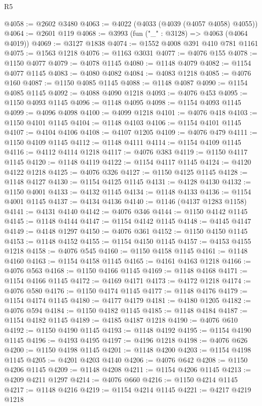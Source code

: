 \begin{lexlean}{R5}
\begin{coremodule}
@4058 := @2602 @3480
@4063 := @4022 (@4033 (@4039 (@4057 @4058) @4055))
@4064 := @2601 @119
@4068 := @3993 (fun ("_" : @3128) => @4063 (@4064 @4019))
@4069 := @3127 @1838
@4074 := @1552 @4008 @391 @410 @781 @1161
@4075 := @1563 @1218
@4076 := @1163 @3031
@4077 := @4076 @155
@4078 := @1150 @4077
@4079 := @4078 @1145
@4080 := @1148 @4079
@4082 := @1154 @4077 @1145
@4083 := @4080 @4082
@4084 := @4083 @1218
@4085 := @4076 @160
@4087 := @1150 @4085 @1145
@4088 := @1148 @4087
@4090 := @1154 @4085 @1145
@4092 := @4088 @4090 @1218
@4093 := @4076 @453
@4095 := @1150 @4093 @1145
@4096 := @1148 @4095
@4098 := @1154 @4093 @1145
@4099 := @4096 @4098
@4100 := @4099 @1218
@4101 := @4076 @418
@4103 := @1150 @4101 @1145
@4104 := @1148 @4103
@4106 := @1154 @4101 @1145
@4107 := @4104 @4106
@4108 := @4107 @1205
@4109 := @4076 @479
@4111 := @1150 @4109 @1145
@4112 := @1148 @4111
@4114 := @1154 @4109 @1145
@4116 := @4112 @4114 @1218
@4117 := @4076 @383
@4119 := @1150 @4117 @1145
@4120 := @1148 @4119
@4122 := @1154 @4117 @1145
@4124 := @4120 @4122 @1218
@4125 := @4076 @326
@4127 := @1150 @4125 @1145
@4128 := @1148 @4127
@4130 := @1154 @4125 @1145
@4131 := @4128 @4130
@4132 := @1150 @4001
@4133 := @4132 @1145
@4134 := @1148 @4133
@4136 := @1154 @4001 @1145
@4137 := @4134 @4136
@4140 := @1146 (@4137 @1283 @1158)
@4141 := @4131 @4140
@4142 := @4076 @346
@4144 := @1150 @4142 @1145
@4145 := @1148 @4144
@4147 := @1154 @4142 @1145
@4148 := @4145 @4147
@4149 := @4148 @1297
@4150 := @4076 @361
@4152 := @1150 @4150 @1145
@4153 := @1148 @4152
@4155 := @1154 @4150 @1145
@4157 := @4153 @4155 @1218
@4158 := @4076 @545
@4160 := @1150 @4158 @1145
@4161 := @1148 @4160
@4163 := @1154 @4158 @1145
@4165 := @4161 @4163 @1218
@4166 := @4076 @563
@4168 := @1150 @4166 @1145
@4169 := @1148 @4168
@4171 := @1154 @4166 @1145
@4172 := @4169 @4171
@4173 := @4172 @1218
@4174 := @4076 @580
@4176 := @1150 @4174 @1145
@4177 := @1148 @4176
@4179 := @1154 @4174 @1145
@4180 := @4177 @4179
@4181 := @4180 @1205
@4182 := @4076 @594
@4184 := @1150 @4182 @1145
@4185 := @1148 @4184
@4187 := @1154 @4182 @1145
@4189 := @4185 @4187 @1218
@4190 := @4076 @610
@4192 := @1150 @4190 @1145
@4193 := @1148 @4192
@4195 := @1154 @4190 @1145
@4196 := @4193 @4195
@4197 := @4196 @1218
@4198 := @4076 @626
@4200 := @1150 @4198 @1145
@4201 := @1148 @4200
@4203 := @1154 @4198 @1145
@4205 := @4201 @4203 @4140
@4206 := @4076 @642
@4208 := @1150 @4206 @1145
@4209 := @1148 @4208
@4211 := @1154 @4206 @1145
@4213 := @4209 @4211 @1297
@4214 := @4076 @660
@4216 := @1150 @4214 @1145
@4217 := @1148 @4216
@4219 := @1154 @4214 @1145
@4221 := @4217 @4219 @1218

\end{coremodule}
\end{lexlean}
